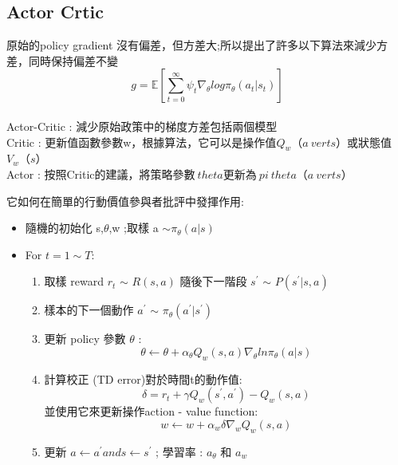 \documentclass[14pt,a4paper]{report}  %
\begin{document}
\subsection{Actor Crtic}
原始的policy gradient 沒有偏差，但方差大;所以提出了許多以下算法來減少方差，同時保持偏差不變\\[5pt]
$$g = \mathbb{E}[\sum_{t=0}^\infty\psi_t\nabla_\theta log\pi_\theta(a_t \vert s_t)]$$\\[5pt]
Actor-Critic : 減少原始政策中的梯度方差包括兩個模型\\[5pt]
Critic : 更新值函數參數w，根據算法，它可以是操作值$ Q_w（a \ vert s）$或狀態值$ V_w（s）$ \\[5pt]
Actor : 按照Critic的建議，將策略參數$ \ theta $更新為$ \ pi_ \ theta（a \ vert s）$\\[5pt]
\begin{Large}
它如何在簡單的行動價值參與者批評中發揮作用:
\end{Large}
\begin{itemize}
\item 隨機的初始化 s,$\theta$,w ;取樣 a $\sim
\pi_\theta(a \vert s)$
\end{itemize}
\begin{itemize}
\item For $t =1 \sim T:$ 
\begin{enumerate}[1]
      \item 取樣 reward $r_t$ $\sim$ $R(s,a)$ 隨後下一階段 $s^{'}$ $\sim$ $P(s^{'}\vert s,a)$ 
      \item 樣本的下一個動作 $a^{'}$ $\sim$ $\pi_\theta(a^{'}\vert s^{'})$
    
       \item 更新 policy 參數 $\theta$ :\\
       $$\theta\leftarrow\theta+\alpha_\theta Q_w(s,a)\nabla_\theta ln\pi_\theta(a\vert s)$$
       \item 計算校正 (TD error)對於時間t的動作值:\\
       $$\delta = r_t + \gamma Q_w(s^{'},a^{'})-Q_w(s,a)$$並使用它來更新操作action - value function:\\
       $$w\leftarrow w+\alpha_w \delta \nabla_w Q_w(s,a) $$
       \item 更新 $a\leftarrow a^{'} and s \leftarrow s^{'}$ ; 學習率 : $a_\theta$ 和 $a_w$
    \end{enumerate}   
\end{itemize}\newpage
\end{document}
